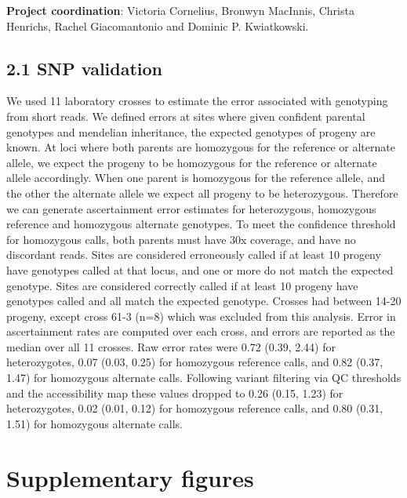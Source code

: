 \documentclass[a4paper,11pt,abstracton,hidelinks]{scrartcl}
\newcommand{\beginsupplement}{%
  \setcounter{table}{0}
  \renewcommand{\thetable}{S\arabic{table}}%
  \setcounter{figure}{0}
  \renewcommand{\thefigure}{S\arabic{figure}}%
}
\begin{document}
%
\textbf{Project coordination}: Victoria Cornelius, Bronwyn MacInnis, Christa Henrichs, Rachel Giacomantonio and Dominic P. Kwiatkowski.

\subsection*{2.1 SNP validation}

We used 11 laboratory crosses to estimate the error associated with genotyping from short reads. 
%
We defined errors at sites where given confident parental genotypes and mendelian inheritance, the expected genotypes of progeny are known. 
%
At loci where both parents are homozygous for the reference or alternate allele, we expect the progeny to be homozygous for the reference or alternate allele accordingly.
%
When one parent is homozygous for the reference allele, and the other the alternate allele we expect all progeny to be heterozygous. 
%
Therefore we can generate ascertainment error estimates for heterozygous, homozygous reference and homozygous alternate genotypes.
%
To meet the confidence threshold for homozygous calls, both parents must have 30x coverage, and have no discordant reads.
%
%
Sites are considered erroneously called if at least 10 progeny have genotypes called at that locus, and one or more do not match the expected genotype. 
%
Sites are considered correctly called if at least 10 progeny have genotypes called and all match the expected genotype. 
%
Crosses had between 14-20 progeny, except cross 61-3 (n=8) which was excluded from this analysis.
%
%
Error in ascertainment rates are computed over each cross, and errors are reported as the median over all 11 crosses. 
%
%
Raw error rates were 0.72 (0.39, 2.44) for heterozygotes, 0.07 (0.03, 0.25) for homozygous reference calls, and 0.82 (0.37, 1.47) for homozygous alternate calls. 
%
Following variant filtering via QC thresholds and the accessibility map these values dropped to 0.26 (0.15, 1.23) for heterozygotes, 0.02 (0.01, 0.12) for homozygous reference calls, and 0.80 (0.31, 1.51) for homozygous alternate calls. 






\beginsupplement

\section*{Supplementary figures}




\clearpage
\end{document}
